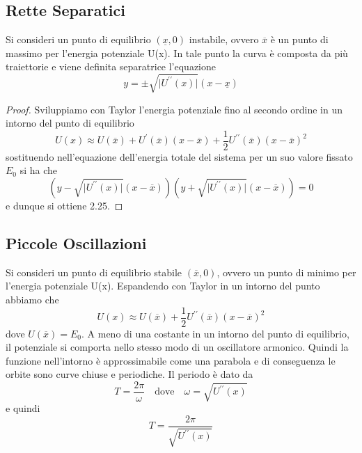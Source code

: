\subsection{Rette Separatici}

Si consideri un punto di equilibrio $(\underline{x},0)$ instabile, ovvero $\overline{x}$ \`{e} un punto di massimo per l'energia potenziale U(x). In tale punto la curva \`{e} composta da pi\`{u} traiettorie e  viene definita separatrice l'equazione
\begin{equation}
	y = \pm \sqrt{\vert U^{\prime \prime}(x) \vert}(x-\underline{x})
\end{equation}

\begin{proof}
	Sviluppiamo con Taylor l'energia potenziale fino al secondo ordine in un intorno del punto di equilibrio
	\begin{equation*}
		U(x) \approx U(\overline{x}) + U^{\prime}(\overline{x})(x-\overline{x})+\frac{1}{2}U^{\prime \prime}(\overline{x})(x-\overline{x})^2
	\end{equation*}
sostituendo nell'equazione dell'energia totale del sistema per un suo valore fissato $E_0$ si ha che 
\begin{equation*}
	\left  (y -\sqrt{\vert U^{\prime \prime}(x) \vert}(x-\overline{x})\right)\left (y +\sqrt{\vert U^{\prime \prime}(x) \vert}(x-\overline{x})\right) = 0
\end{equation*}
e dunque si ottiene 2.25.

\end{proof}

\subsection{Piccole Oscillazioni}

Si consideri un punto di equilibrio stabile $(\overline{x} ,0)$, ovvero un punto di minimo per l'energia potenziale U(x). Espandendo con Taylor in un intorno del punto abbiamo che 
\begin{equation*}
	U(x) \approx U(\overline{x}) + \frac{1}{2}U^{\prime \prime} (\overline{x})(x-\overline{x})^2
\end{equation*}
dove $U(\overline{x}) = E_0$. A meno di una costante in un intorno del punto di equilibrio, il potenziale si comporta nello stesso modo di un oscillatore armonico. Quindi la funzione nell'intorno \`{e} approssimabile come una parabola e di conseguenza le orbite sono curve chiuse e periodiche. Il periodo \`{e} dato da 
\begin{equation*}
	T = \frac{2 \pi}{\omega}  \quad \text{dove} \quad \omega =\sqrt{U^{\prime \prime}(x)} 
\end{equation*}
e quindi
\begin{equation}
	T = \frac{2 \pi}{\sqrt{U^{\prime \prime}(x)}}
\end{equation}


